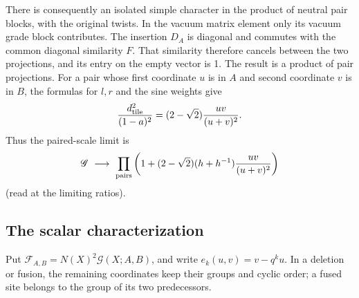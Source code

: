 There is consequently an isolated simple character in the product of
neutral pair blocks, with the original twists. In the vacuum matrix
element only its vacuum grade block contributes. The insertion $D_A$
is diagonal and commutes with the common diagonal similarity $F$.
That similarity therefore cancels between the two projections, and
its entry on the empty vector is 1. The result is a product of pair
projections. For a pair
whose first coordinate $u$ is in $A$ and second coordinate $v$ is
in $B$, the formulas for $l,r$ and the sine weights give
\[
\frac{d_{\rm tile}^2}{(1-a)^2}
 =(2-\sqrt2)\frac{uv}{(u+v)^2}.
\]
Thus the paired-scale limit is
\begin{equation}\label{j:paired-vacuum-limit}
\mathscr G\ \longrightarrow\ \prod_{\rm pairs}\left(1+
 (2-\sqrt2)(h+h^{-1})\frac{uv}{(u+v)^2}\right)
\end{equation}
(read at the limiting ratios).

\subsection{The scalar characterization}

Put $\mathscr F_{A,B}=N(X)^2\mathscr G(X;A,B)$, and write
$e_k(u,v)=v-q^ku$. In a deletion or fusion, the remaining coordinates
keep their groups and cyclic order; a fused site belongs to the group
of its two predecessors.

